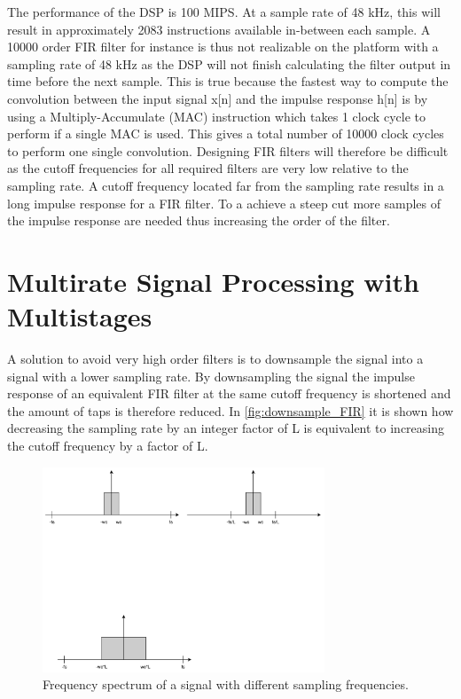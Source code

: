 The performance of the DSP is 100 MIPS. At a sample rate of 48 kHz, this will result in approximately 2083 instructions available in-between each sample. A 10000 order FIR filter for instance is thus not realizable on the platform with a sampling rate of 48 kHz as the DSP will not finish calculating the filter output in time before the next sample. This is true because the fastest way to compute the convolution between the input signal x[n] and the impulse response h[n] is by using a Multiply-Accumulate (MAC) instruction which takes 1 clock cycle to perform if a single MAC is used. This gives a total number of 10000 clock cycles to perform one single convolution. Designing FIR filters will therefore be difficult as the cutoff frequencies for all required filters are very low relative to the sampling rate. A cutoff frequency located far from the sampling rate results in a long impulse response for a FIR filter. To a achieve a steep cut more samples of the impulse response are needed thus increasing the order of the filter. 

\section{Multirate Signal Processing with Multistages}
A solution to avoid very high order filters is to downsample the signal into a signal with a lower sampling rate. By downsampling the signal the impulse response of an equivalent FIR filter at the same cutoff frequency is shortened and the amount of taps is therefore reduced. In \autoref{fig:downsample_FIR} it is shown how decreasing the sampling rate by an integer factor of L is equivalent to increasing the cutoff frequency by a factor of L.


\begin{figure}[H]
\centering
\includegraphics[width=0.75\textwidth]{figures/downsample_FIR.pdf}
\caption{Frequency spectrum of a signal with different sampling frequencies.}
\label{fig:downsample_FIR}
\end{figure}

